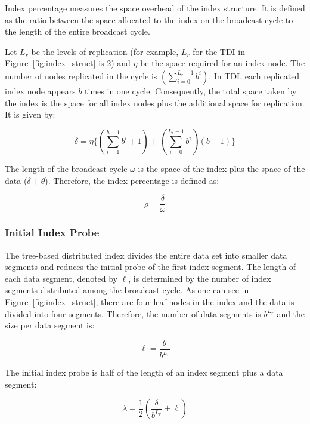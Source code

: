 Index percentage measures the space overhead of the index
structure. It is defined as the ratio between the space allocated
to the index on the broadcast cycle to the length of the entire
broadcast cycle.

Let $L_r$ be the levels of replication (for example, $L_r$ for the
TDI in Figure~\ref{fig:index_struct} is 2) and $\eta$ be the space
required for an index node. The number of nodes replicated in the
cycle is $(\displaystyle\sum\limits_{i=0}^{L_r-1} b^i)$. In TDI,
each replicated index node appears $b$ times in one cycle.
Consequently, the total space taken by the index is the space for
all index nodes plus the additional space for replication. It is
given by:

\begin{equation}
\delta = \eta\{(\displaystyle\sum\limits_{i=1}^{h-1} b^i + 1) +
(\displaystyle\sum\limits_{i=0}^{L_r-1} b^i)(b - 1)\}
\end{equation}

The length of the broadcast cycle $\omega$ is the space of the
index plus the space of the data ($\delta+\theta$). Therefore, the
index percentage is defined as:

\begin{equation}
\rho = \frac{\delta}{\omega}
\end{equation}

\subsubsection{Initial Index Probe}

The tree-based distributed index divides the entire data set into
smaller data segments and reduces the initial probe of the first
index segment. The length of each data segment, denoted by $\ell$,
is determined by the number of index segments distributed among
the broadcast cycle. As one can see in
Figure~\ref{fig:index_struct}, there are four leaf nodes in the
index and the data is divided into four segments. Therefore, the
number of data segments is $b^{L_r}$ and the size per data segment
is:

\begin{equation}
\ell = \frac{\theta}{b^{L_r}}
\end{equation}

The initial index probe is half of the length of an index segment
plus a data segment:

\begin{equation}
\lambda = \frac{1}{2}(\frac{\delta}{b^{L_r}}+\ell)
\end{equation}

